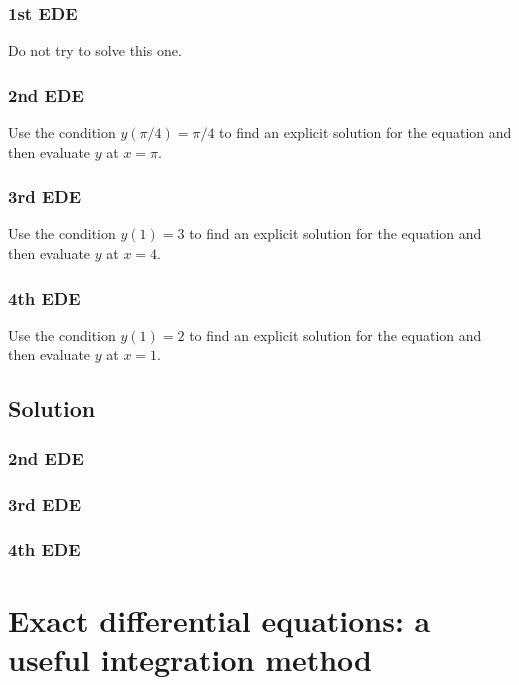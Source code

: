 \subsubsection{1st EDE}
Do not try to solve this one.

\subsubsection{2nd EDE}
Use the condition $y(\pi/4)=\pi/4$ to find an explicit solution for the equation and then evaluate $y$ at $x=\pi$.

\subsubsection{3rd EDE}
Use the condition $y(1)=3$ to find an explicit solution for the equation and then evaluate $y$ at $x=4$.

\subsubsection{4th EDE}
Use the condition $y(1)=2$ to find an explicit solution for the equation and then evaluate $y$ at $x=1$.


\subsection*{Solution}

\subsubsection{2nd EDE}
\six{}


\subsubsection{3rd EDE}
\six{}


\subsubsection{4th EDE}
\six{}


\timebox




\newpage
\section{Exact differential equations: a useful integration method}

